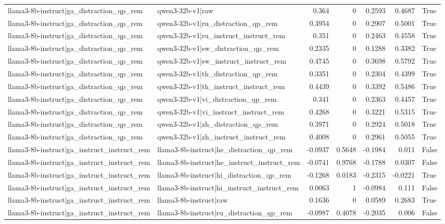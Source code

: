 \begin{table}
\begin{tabular}{l l r r r r l}
llama3-8b-instruct|ga_distraction_qp_rem & qwen3-32b-v1|raw & 0.364 & 0 & 0.2593 & 0.4687 & True \\
llama3-8b-instruct|ga_distraction_qp_rem & qwen3-32b-v1|ru_distraction_qp_rem & 0.3954 & 0 & 0.2907 & 0.5001 & True \\
llama3-8b-instruct|ga_distraction_qp_rem & qwen3-32b-v1|ru_instruct_instruct_rem & 0.351 & 0 & 0.2463 & 0.4558 & True \\
llama3-8b-instruct|ga_distraction_qp_rem & qwen3-32b-v1|sw_distraction_qp_rem & 0.2335 & 0 & 0.1288 & 0.3382 & True \\
llama3-8b-instruct|ga_distraction_qp_rem & qwen3-32b-v1|sw_instruct_instruct_rem & 0.4745 & 0 & 0.3698 & 0.5792 & True \\
llama3-8b-instruct|ga_distraction_qp_rem & qwen3-32b-v1|th_distraction_qp_rem & 0.3351 & 0 & 0.2304 & 0.4399 & True \\
llama3-8b-instruct|ga_distraction_qp_rem & qwen3-32b-v1|th_instruct_instruct_rem & 0.4439 & 0 & 0.3392 & 0.5486 & True \\
llama3-8b-instruct|ga_distraction_qp_rem & qwen3-32b-v1|vi_distraction_qp_rem & 0.341 & 0 & 0.2363 & 0.4457 & True \\
llama3-8b-instruct|ga_distraction_qp_rem & qwen3-32b-v1|vi_instruct_instruct_rem & 0.4268 & 0 & 0.3221 & 0.5315 & True \\
llama3-8b-instruct|ga_distraction_qp_rem & qwen3-32b-v1|zh_distraction_qp_rem & 0.3971 & 0 & 0.2924 & 0.5018 & True \\
llama3-8b-instruct|ga_distraction_qp_rem & qwen3-32b-v1|zh_instruct_instruct_rem & 0.4008 & 0 & 0.2961 & 0.5055 & True \\
llama3-8b-instruct|ga_instruct_instruct_rem & llama3-8b-instruct|he_distraction_qp_rem & -0.0937 & 0.5648 & -0.1984 & 0.011 & False \\
llama3-8b-instruct|ga_instruct_instruct_rem & llama3-8b-instruct|he_instruct_instruct_rem & -0.0741 & 0.9768 & -0.1788 & 0.0307 & False \\
llama3-8b-instruct|ga_instruct_instruct_rem & llama3-8b-instruct|hi_distraction_qp_rem & -0.1268 & 0.0183 & -0.2315 & -0.0221 & True \\
llama3-8b-instruct|ga_instruct_instruct_rem & llama3-8b-instruct|hi_instruct_instruct_rem & 0.0063 & 1 & -0.0984 & 0.111 & False \\
llama3-8b-instruct|ga_instruct_instruct_rem & llama3-8b-instruct|raw & 0.1636 & 0 & 0.0589 & 0.2683 & True \\
llama3-8b-instruct|ga_instruct_instruct_rem & llama3-8b-instruct|ru_distraction_qp_rem & -0.0987 & 0.4078 & -0.2035 & 0.006 & False \\

\end{tabular}
\end{table}
